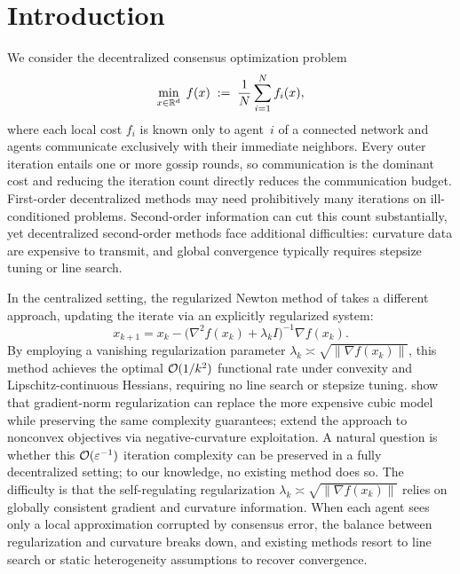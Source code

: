 \documentclass[review,onefignum,onetabnum]{siamart171218}
\begin{document}
	\section{Introduction}\label{sec:intro}
	We consider the decentralized consensus optimization problem
	\begin{equation}\label{eq:intro_prob}
		\min_{x\in\mathbb{R}^d}\; f(x)\;:=\;\frac{1}{N}\sum_{i=1}^N f_i(x),
	\end{equation}
	where each local cost $f_i$ is known only to agent~$i$ of a
	connected network and agents communicate exclusively with their
	immediate neighbors.
	Every outer iteration entails one or more gossip rounds, so
	communication is the dominant cost and
	reducing the iteration count directly reduces
	the communication budget.
	First-order decentralized methods may need prohibitively many
	iterations on ill-conditioned problems.
	Second-order information can cut this count substantially, yet
	decentralized second-order methods face additional difficulties:
	curvature data are expensive to transmit, and global convergence
	typically requires stepsize tuning or line search.

	In the centralized setting, the regularized Newton method of
	\citet{mishchenko2023rn} takes a different approach, updating
	the iterate via an explicitly regularized system:
	\[
	x_{k+1} = x_k - \bigl(\nabla^2 f(x_k) + \lambda_k I\bigr)^{-1} \nabla f(x_k).
	\]
	By employing a vanishing regularization parameter
	$\lambda_k\asymp\sqrt{\|\nabla f(x_k)\|}$, this method achieves
	the optimal $\mathcal{O}(1/k^2)$ functional rate under convexity
	and Lipschitz-continuous Hessians, requiring no line search or
	stepsize tuning.
	\citet{doikov2024gradient} show that gradient-norm regularization
	can replace the more expensive cubic model
	\citep{nesterov2006cubic,cartis2011arc} while preserving the
	same complexity guarantees;
	\citet{ding2025nonconvex} extend the approach to nonconvex
	objectives via negative-curvature exploitation.
	A natural question is whether this
	$\mathcal{O}(\varepsilon^{-1})$ iteration complexity can be preserved
	in a fully decentralized setting;
	to our knowledge, no existing method does so.
	The difficulty is that the self-regulating regularization
	$\lambda_k\asymp\sqrt{\|\nabla f(x_k)\|}$ relies on globally
	consistent gradient and curvature information.
	When each agent sees only a local approximation corrupted
	by consensus error, the balance between regularization and curvature
	breaks down, and existing methods resort to line search or static
	heterogeneity assumptions to recover convergence.
\end{document}
